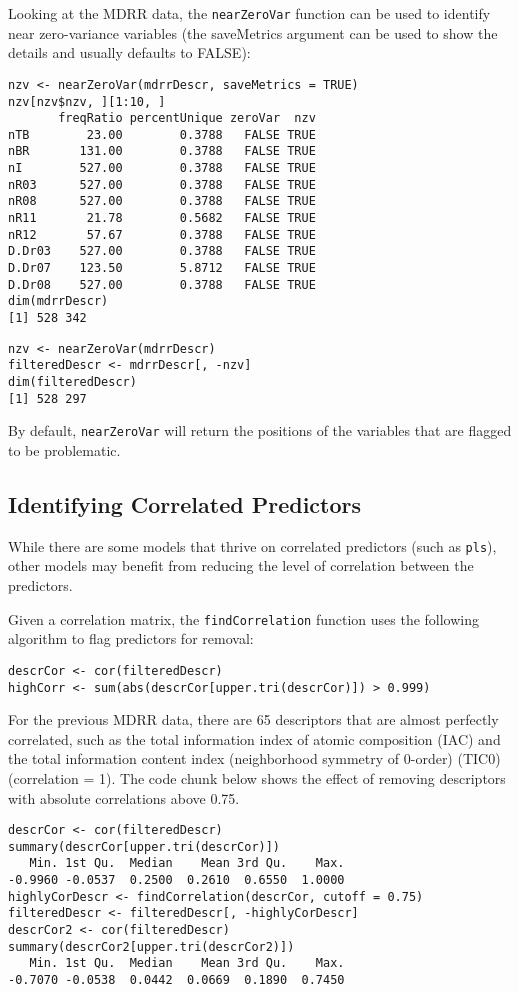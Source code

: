 \documentclass[caret-main.tex]{subfiles}
\begin{document}

Looking at the MDRR data, the \texttt{nearZeroVar} function can be used to identify near zero-variance variables (the saveMetrics argument can be used to show the details and usually defaults to FALSE):

\begin{verbatim}
nzv <- nearZeroVar(mdrrDescr, saveMetrics = TRUE)
nzv[nzv$nzv, ][1:10, ]
       freqRatio percentUnique zeroVar  nzv
nTB        23.00        0.3788   FALSE TRUE
nBR       131.00        0.3788   FALSE TRUE
nI        527.00        0.3788   FALSE TRUE
nR03      527.00        0.3788   FALSE TRUE
nR08      527.00        0.3788   FALSE TRUE
nR11       21.78        0.5682   FALSE TRUE
nR12       57.67        0.3788   FALSE TRUE
D.Dr03    527.00        0.3788   FALSE TRUE
D.Dr07    123.50        5.8712   FALSE TRUE
D.Dr08    527.00        0.3788   FALSE TRUE
dim(mdrrDescr)
[1] 528 342
\end{verbatim}
\begin{verbatim}
nzv <- nearZeroVar(mdrrDescr)
filteredDescr <- mdrrDescr[, -nzv]
dim(filteredDescr)
[1] 528 297
\end{verbatim}
By default, \texttt{nearZeroVar} will return the positions of the variables that are flagged to be problematic.

\newpage
\subsection{Identifying Correlated Predictors}

While there are some models that thrive on correlated predictors (such as \texttt{pls}), other models may benefit from reducing the level of correlation between the predictors.

Given a correlation matrix, the \texttt{findCorrelation} function uses the following algorithm to flag predictors for removal:

\begin{verbatim}
descrCor <- cor(filteredDescr)
highCorr <- sum(abs(descrCor[upper.tri(descrCor)]) > 0.999)

\end{verbatim}
For the previous MDRR data, there are 65 descriptors that are almost perfectly correlated, such as the total information index of atomic composition (IAC) and the total information content index (neighborhood symmetry of 0-order) (TIC0) (correlation = 1). The code chunk below shows the effect of removing descriptors with absolute correlations above 0.75.
\begin{verbatim}
descrCor <- cor(filteredDescr)
summary(descrCor[upper.tri(descrCor)])
   Min. 1st Qu.  Median    Mean 3rd Qu.    Max. 
-0.9960 -0.0537  0.2500  0.2610  0.6550  1.0000 
highlyCorDescr <- findCorrelation(descrCor, cutoff = 0.75)
filteredDescr <- filteredDescr[, -highlyCorDescr]
descrCor2 <- cor(filteredDescr)
summary(descrCor2[upper.tri(descrCor2)])
   Min. 1st Qu.  Median    Mean 3rd Qu.    Max. 
-0.7070 -0.0538  0.0442  0.0669  0.1890  0.7450 
\end{verbatim}
\newpage
\end{document}

